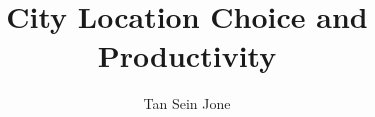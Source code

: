 \documentclass[10pt]{article}
\title{City Location Choice and Productivity}
\author{Tan Sein Jone}
\date{}
\begin{document}
\doublespacing
\maketitle









\end{document}

